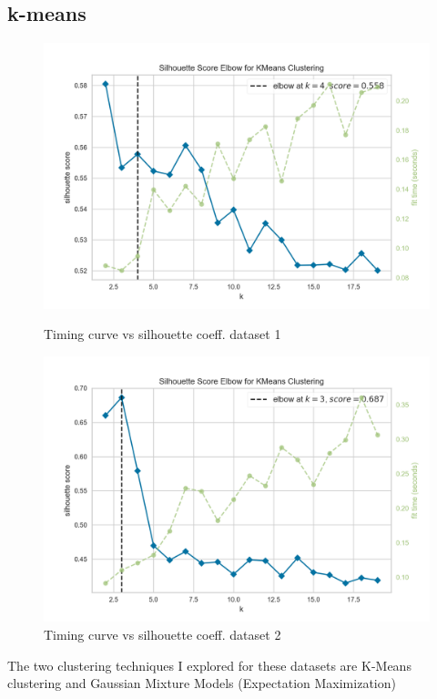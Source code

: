 \subsection{k-means}
\begin{figure}
    \begin{minipage}{0.5\textwidth}
        \centering
        \includegraphics[width=.9\linewidth]{elbowds1.png}
        \caption{Timing curve vs silhouette coeff. dataset 1}\label{Fig:K-means vs silhouette coeff. dataset 1}
    \end{minipage}\hfill
    \begin{minipage}{0.5\textwidth}
        \centering
        \includegraphics[width=.9\linewidth]{elbowds2.png}
        \caption{Timing curve vs silhouette coeff. dataset 2}\label{Fig:K-means vs silhouette coeff. dataset 2}
    \end{minipage}
\end{figure}
The two clustering techniques I explored for these datasets are K-Means clustering and Gaussian Mixture Models (Expectation Maximization)
